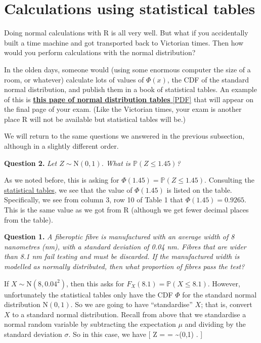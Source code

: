 \documentclass[
  letterpaper,
]{report}
\theoremstyle{definition}
\theoremstyle{definition}
\theoremstyle{remark}
\begin{document}
\hypertarget{normal-tables}{%
\section{Calculations using statistical tables}\label{normal-tables}}

Doing normal calculations with R is all very well. But what if you
accidentally built a time machine and got transported back to Victorian
times. Then how would you perform calculations with the normal
distribution?

In the olden days, someone would (using some enormous computer the size
of a room, or whatever) calculate lots of values of \(\Phi(x)\), the CDF
of the standard normal distribution, and publish them in a book of
statistical tables. An example of this is
\href{https://mpaldridge.github.io/math1710/stat-tab.pdf}{\textbf{this
page of normal distribution tables} {[}PDF{]}} that will appear on the
final page of your exam. (Like the Victorian times, your exam is another
place R will not be available but statistical tables will be.)

We will return to the same questions we answered in the previous
subsection, although in a slightly different order.

\textbf{Question 2.} \emph{Let \(Z \sim \mathrm{N}(0,1)\). What is
\(\mathbb P(Z \leq 1.45)\)?}

As we noted before, this is asking for
\(\Phi(1.45) = \mathbb P(Z \leq 1.45)\). Consulting the
\href{https://mpaldridge.github.io/math1710/stat-tab.pdf}{statistical
tables}, we see that the value of \(\Phi(1.45)\) is listed on the table.
Specifically, we see from column 3, row 10 of Table 1 that
\(\Phi(1.45) = 0.9265\). This is the same value as we got from R
(although we get fewer decimal places from the table).

\textbf{Question 1.} \emph{A fiberoptic fibre is manufactured with an
average width of 8 nanometres (nm), with a standard deviation of 0.04
nm. Fibres that are wider than 8.1 nm fail testing and must be
discarded. If the manufactured width is modelled as normally
distributed, then what proportion of fibres pass the test?}

If \(X \sim \mathrm{N}(8, 0.04^2)\), then this asks for
\(F_X(8.1) = \mathbb P(X \leq 8.1)\). However, unfortunately the
statistical tables only have the CDF \(\Phi\) for the standard normal
distribution \(\mathrm N(0,1)\). So we are going to have ``standardise''
\(X\); that is, convert \(X\) to a standard normal distribution. Recall
from above that we standardise a normal random variable by subtracting
the expectation \(\mu\) and dividing by the standard deviation
\(\sigma\). So in this case, we have {[} Z =  =
 \sim {}(0,1) . {]}
\end{document}

